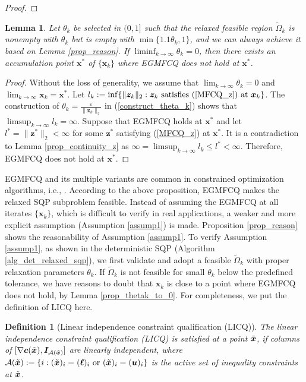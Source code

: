 \documentclass[aos]{imsart}
\numberwithin{equation}{section}
\theoremstyle{plain}
\newtheorem{definition}{Definition}
\newtheorem{lemma}{Lemma}
\begin{document}
\begin{appendix}
\begin{proof}
\end{proof}


\begin{lemma}
    Let $\theta_k$ be selected in $(0,1]$ such that the relaxed feasible region $\widetilde{\Omega}_k$ is nonempty with $\theta_k$ but is empty with $\min\{1.1\theta_k,1\}$, and we can always achieve it based on Lemma \ref{prop_reason}. If $\mathop{\lim \inf}_{k \to \infty} \theta_k = 0$, then there exists an accumulation point $\bm{x}^{*}$ of $\{\bm{x}_k\}$ where EGMFCQ does not hold at $\bm{x}^{*}$.
\end{lemma}


\begin{proof}
    Without the loss of generality, we assume that $\lim_{k \to \infty} \theta_k = 0$ and $\lim_{k \to \infty} \bm{x}_k = \bm{x}^{*}$. Let $l_k := \inf \{\|\bm{z}_k\|_2: \bm{z}_k~ \text{satisfies (\ref{MFCQ_z}) at}~ \bm{x}_k\}$. The construction of $\theta_k = \frac{\varepsilon}{\|\bm{z}_k\|_2}$ in (\ref{construct_theta_k}) shows that $\mathop{\lim \sup}_{k \to \infty} l_k = \infty$. Suppose that EGMFCQ holds at $\bm{x}^{*}$ and let $l^{*} = \|\bm{z}^{*}\|_2 < \infty$ for some $\bm{z}^{*}$ satisfying (\ref{MFCQ_z}) at $\bm{x}^{*}$. It is a contradiction to Lemma \ref{prop_continuity_z} as $\infty = \mathop{\lim \sup}_{k \to \infty} l_k \leq l^{*} < \infty$. Therefore, EGMFCQ does not hold at $\bm{x}^{*}$.
\end{proof}


EGMFCQ and its multiple variants are common in constrained optimization algorithms, i.e., \cite{burke1989robust, xu2015smoothing}. According to the above proposition, EGMFCQ makes the relaxed SQP subproblem feasible. Instead of assuming the EGMFCQ at all iterates $\{\bm{x}_k\}$, which is difficult to verify in real applications, a weaker and more explicit assumption (Assumption \ref{assump1}) is made. Proposition \ref{prop_reason} shows the reasonability of Assumption \ref{assump1}. To verify Assumption \ref{assump1}, as shown in the deterministic SQP (Algorithm \ref{alg_det_relaxed_sqp}), we first validate and adopt a feasible $\widetilde{\Omega}_k$ with proper relaxation parameters $\theta_k$. If $\widetilde{\Omega}_k$ is not feasible for small $\theta_k$ below the predefined tolerance, we have reasons to doubt that $\bm{x}_k$ is close to a point where EGMFCQ does not hold, by Lemma \ref{prop_thetak_to_0}. For completeness, we put the definition of LICQ here.

\begin{definition}
    [Linear independence constraint qualification (LICQ)]
    \label{definition_LICQ}
    The linear independence constraint qualification (LICQ) is satisfied at a point $\Tilde{\bm{x}}$, if columns of $[\nabla \bm{c}(\Tilde{\bm{x}}), \bm{I}_{\mathcal{A}(\Tilde{\bm{x}})}]$ are linearly independent, where $\mathcal{A}(\Tilde{\bm{x}}):=\{i: (\Tilde{\bm{x}})_i = (\bm{\ell})_i~\text{or}~(\Tilde{\bm{x}})_i = (\bm{u})_i\}$ is the active set of inequality constraints at $\Tilde{\bm{x}}$.
\end{definition}



\end{appendix}
\end{document}
